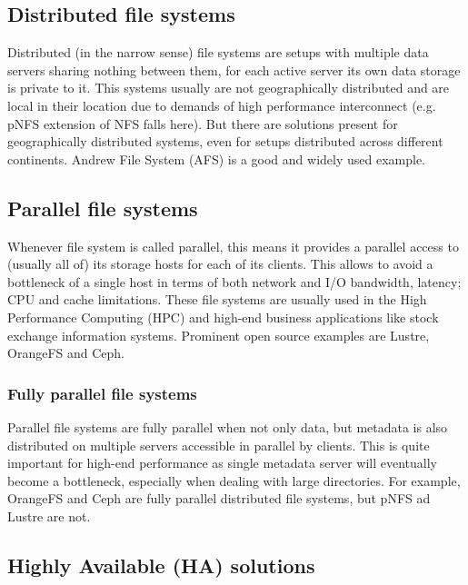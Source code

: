 \documentclass[10pt, a5paper]{article}
\begin{document}
\subsection*{Distributed file systems}

Distributed (in the narrow sense) file systems are setups with multiple data servers sharing nothing between them, for each active server its own data storage is private to it. This systems usually are not geographically distributed and are local in their location due to demands of high performance interconnect (e.g. pNFS\cite{bib3} extension of NFS\cite{bib2} falls here). But there are solutions present for geographically distributed systems, even for setups distributed across different continents. Andrew File System (AFS\cite{bib8}) is a good and widely used example.

\subsection*{Parallel file systems}

Whenever file system is called parallel, this means it provides a parallel access to (usually all of) its storage hosts for each of its clients. This allows to avoid a bottleneck of a single host in terms of both network and I/O bandwidth, latency; CPU and cache limitations. These file systems are usually used in the High Performance Computing (HPC\cite{bib2}\cite{bib9}) and high-end business applications like stock exchange information systems. Prominent open source examples are Lustre\cite{bib10}, OrangeFS\cite{bib11} and Ceph\cite{bib12}.

\subsubsection*{Fully parallel file systems}

Parallel file systems are fully parallel when not only data, but metadata is also distributed on multiple servers accessible in parallel by clients. This is quite important for high-end performance as single metadata server will eventually become a bottleneck, especially when dealing with large directories. For example, OrangeFS\cite{bib11} and Ceph\cite{bib12} are fully parallel distributed file systems, but pNFS\cite{bib4} ad Lustre\cite{bib10} are not.

\subsection*{Highly Available (HA) solutions}
\end{document}
